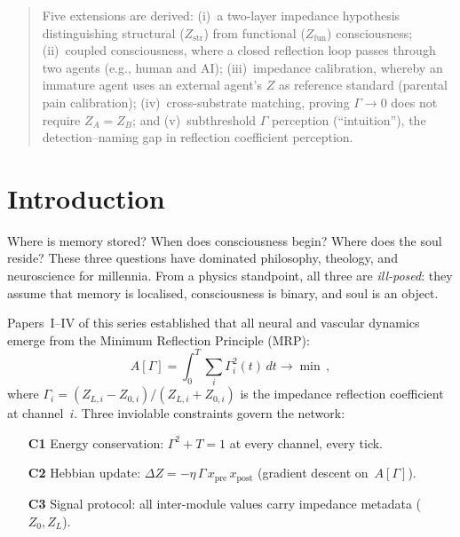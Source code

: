 \documentclass[aps,pre,twocolumn,superscriptaddress,floatfix]{revtex4-2}
\begin{document}
\begin{abstract}
Five extensions are derived: (i)~a two-layer impedance
hypothesis distinguishing structural ($Z_{\text{str}}$)
from functional ($Z_{\text{fun}}$) consciousness;
(ii)~coupled consciousness, where a closed reflection loop
passes through two agents (e.g., human and AI);
(iii)~impedance calibration, whereby an immature agent
uses an external agent's $Z$ as reference standard
(parental pain calibration);
(iv)~cross-substrate matching, proving
$\Gamma\to 0$ does not require $Z_A=Z_B$;
and (v)~subthreshold $\Gamma$ perception (``intuition''),
the detection--naming gap in reflection coefficient
perception.
\end{abstract}

\maketitle

\section{Introduction}
\label{sec:intro}

Where is memory stored?
When does consciousness begin?
Where does the soul reside?
These three questions have dominated philosophy, theology,
and neuroscience for millennia.  From a physics standpoint,
all three are \emph{ill-posed}: they assume that memory is
localised, consciousness is binary, and soul is an object.

Papers~I--IV of this series established that all neural and
vascular dynamics emerge from the Minimum Reflection Principle
(MRP):
\begin{equation}
  A[\Gamma] = \int_0^T \sum_i \Gamma_i^2(t)\,dt \to \min\,,
  \label{eq:MRP}
\end{equation}
where $\Gamma_i=(Z_{L,i}-Z_{0,i})/(Z_{L,i}+Z_{0,i})$ is the
impedance reflection coefficient at channel~$i$.
Three inviolable constraints govern the network:
\begin{itemize}
  \item[\textbf{C1}] Energy conservation: $\Gamma^2+T=1$ at
    every channel, every tick.
  \item[\textbf{C2}] Hebbian update:
    $\Delta Z=-\eta\,\Gamma\,x_{\text{pre}}\,x_{\text{post}}$
    (gradient descent on~$A[\Gamma]$).
  \item[\textbf{C3}] Signal protocol: all inter-module values
    carry impedance metadata ($Z_0,Z_L$).
\end{itemize}
\end{document}
